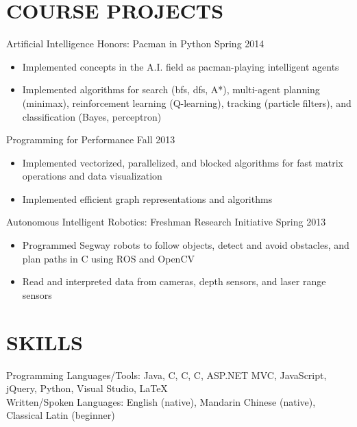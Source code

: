 \documentclass[margin]{res}
\newcommand{\PLUS}{\nolinebreak\hspace{-.05em}\raisebox{.4ex}{\tiny\bf+}}
\newcommand{\CC}{C\PLUS{}\PLUS{}}
\newcommand{\CS}{C\nolinebreak\hspace{-.05em}\raisebox{.4ex}{\scriptsize\bf \#}}
\begin{document}
\begin{resume}
\section{COURSE PROJECTS}

	Artificial Intelligence Honors: Pacman in Python \hfill Spring 2014
	\begin{itemize} \itemsep -2pt
	\item Implemented concepts in the A.I. field as pacman-playing intelligent agents
	\item Implemented algorithms for search (bfs, dfs, A*), multi-agent planning (minimax), reinforcement learning (Q-learning), tracking (particle filters), and classification (Bayes, perceptron)
	\end{itemize}

	Programming for Performance \hfill Fall 2013
	\begin{itemize} \itemsep -2pt
	\item Implemented vectorized, parallelized, and blocked algorithms for fast matrix operations and data visualization
	\item Implemented efficient graph representations and algorithms
	\end{itemize}

	Autonomous Intelligent Robotics: Freshman Research Initiative \hfill Spring 2013
	\begin{itemize} \itemsep -2pt
	\item Programmed Segway robots to follow objects, detect and avoid obstacles, and plan paths in \CC{} using ROS and OpenCV
	\item Read and interpreted data from cameras, depth sensors, and laser range sensors
	\end{itemize}

\section{SKILLS}
	Programming Languages/Tools: Java, C, \CC{}, \CS{}, ASP.NET MVC, JavaScript, jQuery, Python, Visual Studio, \LaTeX\\
	Written/Spoken Languages: English (native), Mandarin Chinese (native), Classical Latin (beginner)

\end{resume}
\end{document}
